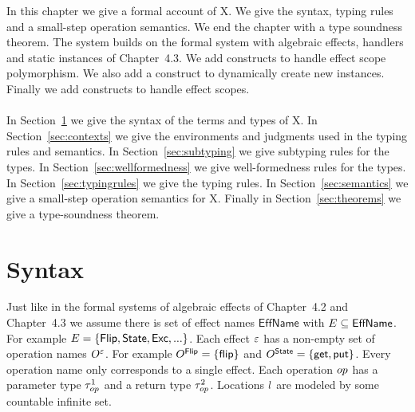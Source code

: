 {In this chapter we give a formal account of X.
We give the syntax, typing rules and a small-step operation semantics.
We end the chapter with a type soundness theorem.
The system builds on the formal system with algebraic effects, handlers and static instances of Chapter~4.3.
We add constructs to handle effect scope polymorphism.
We also add a construct to dynamically create new instances.
Finally we add constructs to handle effect scopes.
\\\\
In Section~\ref{sec:syntax} we give the syntax of the terms and types of X.
In Section~\ref{sec:contexts} we give the environments and judgments used in the typing rules and semantics.
In Section~\ref{sec:subtyping} we give subtyping rules for the types.
In Section~\ref{sec:wellformedness} we give well-formedness rules for the types.
In Section~\ref{sec:typingrules} we give the typing rules.
In Section~\ref{sec:semantics} we give a small-step operation semantics for X.
Finally in Section~\ref{sec:theorems} we give a type-soundness theorem.

\section{Syntax}
\label{sec:syntax}
Just like in the formal systems of algebraic effects of Chapter~4.2 and Chapter~4.3
we assume there is set of effect names $\mathsf{EffName}$ with $E \subseteq \mathsf{EffName}$.
For example $E = \{ \mathsf{Flip}, \mathsf{State}, \mathsf{Exc}, ... \}$.
Each effect $\varepsilon$ has a non-empty set of operation names $O^{\varepsilon}$.
For example $O^{\mathsf{Flip}} = \{\mathsf{flip}\}$ and $O^{\mathsf{State}} = \{\mathsf{get}, \mathsf{put}\}$.
Every operation name only corresponds to a single effect.
Each operation $op$ has a parameter type $\tau^1_{op}$ and a return type $\tau^2_{op}$.
Locations $l$ are modeled by some countable infinite set.

}
